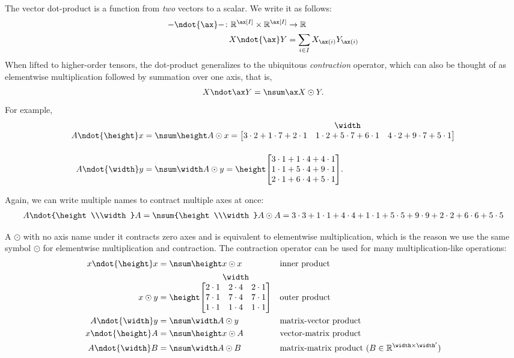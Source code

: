 The vector dot-product is a function from \emph{two} vectors to a scalar. We write it as follows:
\begin{align*}
\mathord- \ndot{\ax} \mathord- \colon \reals^{\ax[I]} \times \reals^{\ax[I]} &\rightarrow \reals \\
  X \ndot{\ax} Y &= \sum_{i\in I} X_{\ax(i)} Y_{\ax(i)}
\end{align*}
When lifted to higher-order tensors, the dot-product generalizes to the ubiquitous \emph{contraction} operator, which can also be thought of as elementwise multiplication followed by summation over one axis, that is,
\begin{equation}
X \ndot\ax Y = \nsum\ax X \odot Y. \label{eq:ndot_as_nsum}
\end{equation}
For example,
\begin{align*}
A \ndot{\height} x &= \nsum\height A \odot x = \nmatrix{}{\width}{
  3\cdot2 + 1\cdot7 + 2\cdot1 & 1\cdot2 + 5\cdot7 + 6\cdot1 & 4\cdot2 + 9\cdot7 + 5\cdot 1
} \\
A \ndot{\width} y &= \nsum\width A \odot y = \nmatrix{\height}{}{
  3\cdot1 + 1\cdot4 + 4\cdot1 \\
  1\cdot1 + 5\cdot4 + 9\cdot1 \\
  2\cdot1 + 6\cdot4 + 5\cdot1
}.
\end{align*}

Again, we can write multiple names to contract multiple axes at once:
\begin{align*}
A \ndot{\height\\\width} A = \nsum{\height\\\width} A \odot A = 3\cdot3 + 1\cdot1 + 4\cdot4 + 1\cdot1 + 5\cdot5 + 9\cdot9 + 2\cdot2 + 6\cdot6 + 5\cdot5
\end{align*}

A $\odot$ with no axis name under it contracts zero axes and is equivalent to elementwise multiplication, which is the reason we use the same symbol $\odot$ for elementwise multiplication and contraction.
%
The contraction operator can be used for many multiplication-like operations:
\begin{align*}
  x \ndot{\height} x &= \nsum\height x \odot x && \text{inner product} \\ \phantom{\sum_i}
  x \odot y &= \nmatrix{\height}{\width}{2 \cdot 1 & 2 \cdot 4 & 2 \cdot 1 \\ 7 \cdot 1 & 7 \cdot 4 & 7 \cdot 1 \\ 1 \cdot 1 & 1 \cdot 4 & 1 \cdot 1} && \text{outer product} \\
  A \ndot{\width} y &= \nsum\width A \odot y && \text{matrix-vector product} \\
  x \ndot{\height} A &= \nsum\height x \odot A && \text{vector-matrix product} \\
  A \ndot{\width} B &= \nsum\width A \odot B && \text{matrix-matrix product}~(B \in \reals^{\width \times \width'})
\end{align*}

